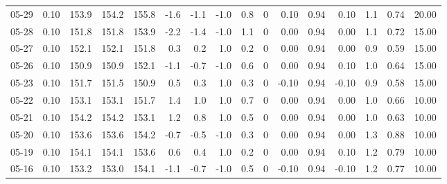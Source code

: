 \begin{threeparttable}
{\begin{tabular}{lrrrrrrrrrrrrrrr}
  05-29 &     0.10 & 153.9 & 154.2 & 155.8 &       -1.6 &           -1.1 &                     -1.0 &                 0.8 &              0 &       0.10 &      0.94 &           0.10 &              1.1 &            0.74 &                  20.00 \\
  05-28 &     0.10 & 151.8 & 151.8 & 153.9 &       -2.2 &           -1.4 &                     -1.0 &                 1.1 &              0 &       0.00 &      0.94 &           0.00 &              1.1 &            0.72 &                  15.00 \\
  05-27 &     0.10 & 152.1 & 152.1 & 151.8 &        0.3 &            0.2 &                      1.0 &                 0.2 &              0 &       0.00 &      0.94 &           0.00 &              0.9 &            0.59 &                  15.00 \\
  05-26 &     0.10 & 150.9 & 150.9 & 152.1 &       -1.1 &           -0.7 &                     -1.0 &                 0.6 &              0 &       0.00 &      0.94 &           0.10 &              1.0 &            0.64 &                  15.00 \\
  05-23 &     0.10 & 151.7 & 151.5 & 150.9 &        0.5 &            0.3 &                      1.0 &                 0.3 &              0 &      -0.10 &      0.94 &          -0.10 &              0.9 &            0.58 &                  15.00 \\
  05-22 &     0.10 & 153.1 & 153.1 & 151.7 &        1.4 &            1.0 &                      1.0 &                 0.7 &              0 &       0.00 &      0.94 &           0.00 &              1.0 &            0.66 &                  10.00 \\
  05-21 &     0.10 & 154.2 & 154.2 & 153.1 &        1.2 &            0.8 &                      1.0 &                 0.5 &              0 &       0.00 &      0.94 &           0.00 &              1.0 &            0.63 &                  10.00 \\
  05-20 &     0.10 & 153.6 & 153.6 & 154.2 &       -0.7 &           -0.5 &                     -1.0 &                 0.3 &              0 &       0.00 &      0.94 &           0.00 &              1.3 &            0.88 &                  10.00 \\
  05-19 &     0.10 & 154.1 & 154.1 & 153.6 &        0.6 &            0.4 &                      1.0 &                 0.2 &              0 &       0.00 &      0.94 &           0.10 &              1.2 &            0.79 &                  10.00 \\
  05-16 &     0.10 & 153.2 & 153.0 & 154.1 &       -1.1 &           -0.7 &                     -1.0 &                 0.5 &              0 &      -0.10 &      0.94 &          -0.10 &              1.2 &            0.77 &                  10.00 \\

\end{tabular}}
\end{threeparttable}
